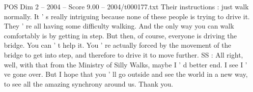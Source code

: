 \begin{textsample}{POS Dim 2 – 2004 – Score 9.00 – 2004/t000177.txt}
Their instructions : just walk normally.
It ' s really intriguing because none of these people is trying to drive it.
They ' re all having some difficulty walking.
And the only way you can walk comfortably is by getting in step.
But then, of course, everyone is driving the bridge.
You can ' t help it.
You ' re actually forced by the movement of the bridge to get into step, and therefore to drive it to move further.
SS : All right, well, with that from the Ministry of Silly Walks, maybe I ' d better end.
I see I ' ve gone over.
But I hope that you ' ll go outside and see the world in a new way, to see all the amazing synchrony around us.
Thank you.

\end{textsample}
